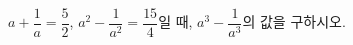 \hspace*{2mm}\begin{minipage}[t]{\dimexpr\linewidth-2mm\relax}\vspace{0pt}
$a+\dfrac{1}{a}=\dfrac{5}{2}$, $a^2-\dfrac{1}{a^2}=\dfrac{15}{4}$일 때, $a^3-\dfrac{1}{a^3}$의 값을 구하시오.\end{minipage}
